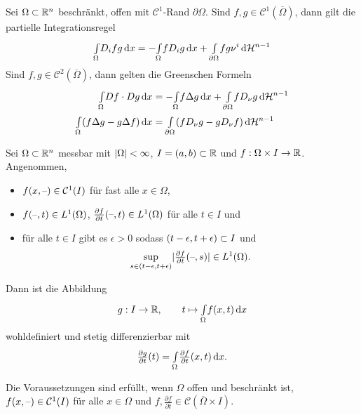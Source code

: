 \documentclass{cheat-sheet}
\newcommand{\HM}{\mathcal{H}} %
\begin{document}
\begin{kor}
  Sei $\Omega \subset \mathbb{R}^n$ beschränkt, offen mit $\mathcal{C}^1$-Rand $\partial \Omega$. Sind $f, g \in \mathcal{C}^1(\overline{\Omega})$, dann gilt die partielle Integrationsregel
  \[ \Int{\Omega}{}{D_i f g}{x} = - \Int{\Omega}{}{f D_i g}{x} + \Int{\partial \Omega}{}{f g \nu^i}{\HM^{n-1}} \]
  Sind $f, g \in \mathcal{C}^2(\overline{\Omega})$, dann gelten die Greenschen Formeln
  \begin{align*}
    \Int{\Omega}{}{Df \cdot Dg}{x} &= - \Int{\Omega}{}{f \Delta g}{x} + \Int{\partial \Omega}{}{f D_{\nu} g}{\HM^{n-1}}\\
    \Int{\Omega}{}{(f \Delta g - g \Delta f)}{x} &= \Int{\partial \Omega}{}{(f D_{\nu} g - g D_{\nu} f)}{\HM^{n-1}}
  \end{align*}
\end{kor}

\begin{prop}
  Sei $\Omega \subset \mathbb{R}^n$ messbar mit $\lvert\Omega\rvert < \infty$, $I = \left( a, b \right) \subset \mathbb{R}$ und $f : \Omega \times I \to \mathbb{R}$. Angenommen,
  \begin{itemize}
    \item $f(x, \text{--}) \in \mathcal{C}^1(I)$ für fast alle $x \in \Omega$,
    \item $f(\text{--}, t) \in L^1(\Omega)$, $\tfrac{\partial f}{\partial t}(\text{--}, t) \in L^1(\Omega)$ für alle $t \in I$ und
    \item für alle $t \in I$ gibt es $\epsilon > 0$ sodass $\left( t-\epsilon, t+\epsilon \right) \subset I$ und
    \[ \sup_{s \in \left( t-\epsilon, t+\epsilon \right)} \lvert\tfrac{\partial f}{\partial t}(\text{--}, s)\rvert \in L^1(\Omega). \]
  \end{itemize}
  Dann ist die Abbildung
  \[
    g : I \to \mathbb{R}, \qquad
    t \mapsto {\textstyle \int\limits_{\Omega}^{}} f(x, t) \,\mathrm{d} x
  \]
  wohldefiniert und stetig differenzierbar mit
  \[ \tfrac{\partial g}{\partial t}(t) = {\textstyle \int\limits_{\Omega}^{}} \tfrac{\partial f}{\partial t}(x,t) \,\mathrm{d} x. \]
\end{prop}

\begin{bem}
  Die Voraussetzungen sind erfüllt, wenn $\Omega$ offen und beschränkt ist, $f(x, \text{--}) \in \mathcal{C}^1(I)$ für alle $x \in \Omega$ und $f, \tfrac{\partial f}{\partial t} \in \mathcal{C}(\overline{\Omega} \times I)$.
\end{bem}
\end{document}
